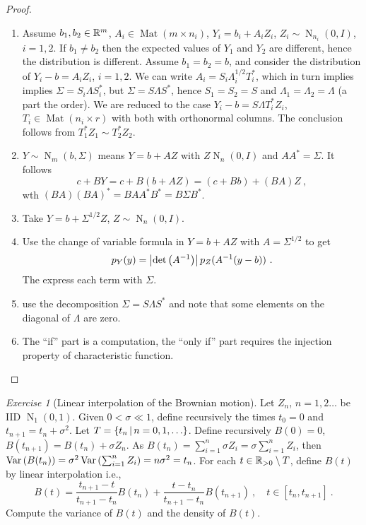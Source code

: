\documentclass[12pt,a4paper]{amsart}
\newcommand{\MRof}[2]{\operatorname{Mat}\left(#1\times#2\right)}
\newcommand{\gaussian}[3]{\operatorname{N}_{#1}\left(#2,#3\right)}
\theoremstyle{plain}%
\theoremstyle{definition}
\theoremstyle{remark}
\newtheorem{exercise}{Exercise}
\begin{document}
\begin{proof}\ 
  \begin{enumerate}
  \item Assume $b_1,b_2 \in \mathbb{R}^m$, $A_i \in \MRof m {n_i}$, $Y_i = b_i + A_i Z_i$, $Z_i \sim \gaussian {n_i} 0 I$, $i = 1,2$. If $b_1 \ne b_2$ then the expected values of $Y_1$ and $Y_2$ are different, hence the distribution is different. Assume $b_1 = b_2 = b$, and consider the distribution of $Y_i - b = A_iZ_i$, $i=1,2$. We can write $A_i = S_i\Lambda_i^{1/2}T_i^*$, which in turn implies implies $\Sigma = S_i \Lambda S_i^*$, but $\Sigma = S\Lambda S^*$, hence $S_1=S_2=S$ and $\Lambda_1=\Lambda_2=\Lambda$ (a part the order). We are reduced to the case $Y_i - b = S\Lambda T_i^* Z_i$, $T_i \in \MRof {n_i} r$ with both with orthonormal columns. The conclusion follows from $T_1^* Z_1 \sim T_2^*Z_2$.
    \item $Y \sim \gaussian m b \Sigma$ means $Y = b + AZ$ with $Z \gaussian n 0 I$ and $AA^* = \Sigma$. It follows
      \begin{equation*}
 c + BY = c + B(b+AZ) = (c+Bb) + (BA) Z \ ,       
      \end{equation*}
wth $(BA)(BA)^* = B AA^*B^* = B \Sigma B^*$.
  \item Take $Y = b + \Sigma^{1/2}Z$, $Z \sim \gaussian n 0 I$.
\item Use the change of variable formula in $Y = b + AZ$ with $A = \Sigma^{1/2}$ to get
  \begin{equation*}
    p_Y(y) = \left\vert\operatorname{det}\left(A^{-1}\right)\right\vert p_Z(A^{-1}(y-b)) \ . 
  \end{equation*}
The express each term with $\Sigma$.
  \item use the decomposition $\Sigma = S \Lambda S^*$ and note that some elements on the diagonal of $\Lambda$ are zero.
  \item The ``if'' part is a computation, the ``only if'' part requires the injection property of characteristic function.
  \end{enumerate}
\end{proof}

\begin{exercise}[Linear interpolation of the Brownian motion] Let $Z_n$, $n=1,2\dots$ be IID $\gaussian 1 0 1$. Given $0 < \sigma \ll 1$, define recursively the times $t_0=0$ and $t_{n+1} = t_n + \sigma^2$. Let $T = \setof{t_n}{n = 0,1,\dots}$. Define recursively $B(0)=0$, $B(t_{n+1}) = B(t_n) + \sigma Z_n$. As $B(t_n) = \sum_{i=1}^n \sigma Z_i = \sigma \sum_{i=1}^n Z_i$, then $\operatorname{Var}\left(B(t_n)\right) = \sigma^2 \operatorname{Var}\left(\sum_{i=1}^n Z_i\right) = n\sigma^2 = t_n$. For each $t \in \mathbb{R}_{>0} \setminus T$, define $B(t)$ by linear interpolation i.e., 
  \begin{equation*}
B(t) = \frac{t_{n+1}-t}{t_{n+1}-t_n}B(t_n) + \frac{t - t_{n}}{t_{n+1}-t_n}B(t_{n+1}) \ , \quad t \in [t_n,t_{n+1}] \ .     
  \end{equation*}
Compute the variance of $B(t)$ and the density of $B(t)$. 
  
\end{exercise}
\end{document}
